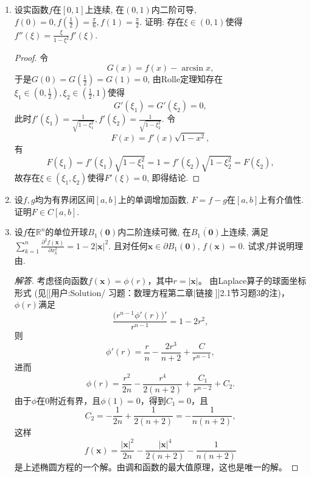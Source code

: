 \begin{4a}
\begin{enumerate}
\begin{proof}
于是若结论不成立, 则\(f'-\mu(f-f(a))\)在\((a,b)\)内恒正或恒负. 不妨设
\[f'(x)-\mu(f(x)-f(a))>0,\quad x\in(a,b),\tag{$\circledast$}\]
则\[\left(\ee^{-\mu x}\left(f(x)-f(a)\right)\right)'
=\ee^{-\mu x}\left(f'(x)-\mu(f(x)-f(a))\right)>0,\quad\forall x\in(a,b).\]
所以\[\ee^{-\mu x}\left(f(x)-f(a)\right)>\ee^{-\mu a}\left(f(a)-f(a)\right)=0,\quad\forall x\in(a,b],\]
即\[f(x)-f(a)>0,\quad\forall x\in(a,b].\]
于是, 由式$(\circledast)$有
\[f'(c)>\mu(f(c)-f(a))>0,\]
与\(f'(c)=0\)矛盾, 证毕.
\end{proof}
\item 设实函数\(f\)在\([0,1]\)上连续, 在\((0,1)\)内二阶可导, 
\(f(0)=0,f\left(\frac{1}{2}\right)=\frac{\pi}{6},f(1)=\frac{\pi}{2}\). 
证明: 存在\(\xi\in(0,1)\)使得\(f''(\xi)=\frac{\xi}{1-\xi^2}f'(\xi)\).
\begin{proof}
令\[G(x)=f(x)-\arcsin x,\]
于是\(G(0)=G\left(\frac{1}{2}\right)=G(1)=0\), 
由Rolle定理知存在\(\xi_1\in\left(0,\frac{1}{2}\right),\xi_2\in\left(\frac{1}{2},1\right)\)使得
\[G'(\xi_1)=G'(\xi_2)=0,\]
此时\(f'(\xi_1)=\frac{1}{\sqrt{1-\xi_1^2}},f'(\xi_2)=\frac{1}{\sqrt{1-\xi_2^2}}\). 
令\[F(x)=f'(x)\sqrt{1-x^2},\]有
\[F(\xi_1)=f'(\xi_1)\sqrt{1-\xi_1^2}=1=f'(\xi_2)\sqrt{1-\xi_2^2}=F(\xi_2),\]
故存在\(\xi\in\left(\xi_1,\xi_2\right)\)使得\(F'(\xi)=0\), 即得结论.
\end{proof}

\item 设\(f,g\)均为有界闭区间\([a,b]\)上的单调增加函数, \(F=f-g\)在\([a,b]\)上有介值性. 证明\(F\in C[a,b]\).
\item 设\(f\)在\(\mathbb{R}^n\)的单位开球\(B_1(\boldsymbol{0})\)内二阶连续可微, 
在\(\overline{B_1(\boldsymbol{0})}\)上连续, 满足\(\sum_{k=1}^{n}\frac{\partial^2f(\boldsymbol{x})}{\partial x_k^2}=1-2|\boldsymbol{x}|^2\). 
且对任何\(\boldsymbol{x}\in\partial B_1(\boldsymbol{0})\), \(f(\boldsymbol{x})=0\). 试求\(f\)并说明理由.
\begin{proof}[解答]
    考虑径向函数$f(\boldsymbol{x})=\phi(r)$，其中$r=|\boldsymbol{x}|$。
    由Laplace算子的球面坐标形式 (见[[用户:Solution/ 习题：数理方程第二章|链接🔗]]2.1节习题3的注)，$\phi(r)$满足
    \[\frac{\big(r^{n-1}\phi'(r)\big)'}{r^{n-1}}=1-2r^2,\]
    则\[\phi'(r)=\frac{r}{n}-\frac{2r^3}{n+2}+\frac{C}{r^{n-1}},\]
    进而\[\phi(r)=\frac{r^2}{2n}-\frac{r^4}{2(n+2)}+\frac{C_1}{r^{n-2}}+C_2.\]
    由于$\phi$在$0$附近有界，且$\phi(1)=0$，得到$C_1=0$，且
    \[C_2=-\frac{1}{2n}+\frac{1}{2(n+2)}=-\frac{1}{n(n+2)},\]
    这样\[f(\boldsymbol{x})=\frac{|\boldsymbol{x}|^2}{2n}
    -\frac{|\boldsymbol{x}|^4}{2(n+2)}-\frac{1}{n(n+2)}\]
    是上述椭圆方程的一个解。由调和函数的最大值原理，这也是唯一的解。
\end{proof}
\end{enumerate}
\end{4a}
